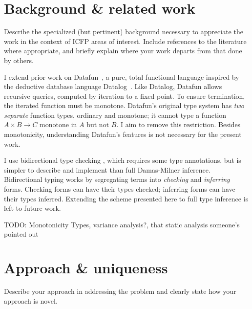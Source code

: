 \documentclass[sigplan,screen,dvipsnames]{acmart}
\newcommand\x\times
\newcommand\todo[1]{{\color{Purple}#1}}
\begin{document}


\section{Background \& related work}

\todo{
Describe the specialized (but pertinent) background necessary to appreciate
the work in the context of ICFP areas of interest. Include references to the
literature where appropriate, and briefly explain where your work departs
from that done by others.
}

\newcommand\mto{\overset{+}{\to}}

I extend prior work on Datafun~\citep{datafun}, a pure, total functional
language inspired by the deductive database language Datalog~\citep{datalog}.
%
Like Datalog, Datafun allows recursive queries, computed by iteration to a fixed point. To ensure termination, the iterated function must be monotone.
%
Datafun's original type system has \emph{two separate} function types, ordinary
and monotone; it cannot type a function $A \x B \to C$ monotone in $A$ but not
$B$. I aim to remove this restriction. Besides monotonicity, understanding
Datafun's features is not necessary for the present work.

I use bidirectional type checking \cite{bidirectional}, which requires some type
annotations, but is simpler to describe and implement than full Damas-Milner
inference. Bidirectional typing works by segregating terms into \emph{checking}
and \emph{inferring} forms. Checking forms can have their types checked;
inferring forms can have their types inferred. Extending the scheme presented
here to full type inference is left to future work.



\todo{TODO: Monotonicity Types, variance analysis?, that static analysis someone's pointed out}


\section{Approach \& uniqueness}
\todo{Describe your approach in addressing the problem and clear\-ly state how
  your approach is novel.}
\end{document}
